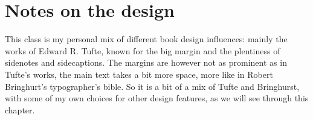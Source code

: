 \chapter{Notes on the design}

This class is my personal mix of different book design influences: mainly the works of Edward R. Tufte, known for the big margin and the plentiness of sidenotes and sidecaptions. The margins are however not as prominent as in Tufte's works, the main text takes a bit more space, more like in Robert Bringhurt's typographer's bible. So it is a bit of a mix of Tufte and Bringhurst, with some of my own choices for other design features, as we will see through this chapter.


